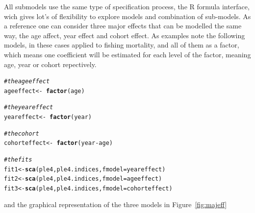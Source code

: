 \documentclass[a4paper,english,10pt]{article}\usepackage[]{graphicx}\usepackage[]{color}
\makeatletter
\newcommand{\hlcom}[1]{\textcolor[rgb]{0.678,0.584,0.686}{\textit{#1}}}%
\newcommand{\hlopt}[1]{\textcolor[rgb]{0,0,0}{#1}}%
\newcommand{\hlstd}[1]{\textcolor[rgb]{0.345,0.345,0.345}{#1}}%
\newcommand{\hlkwb}[1]{\textcolor[rgb]{0.69,0.353,0.396}{#1}}%
\newcommand{\hlkwc}[1]{\textcolor[rgb]{0.333,0.667,0.333}{#1}}%
\newcommand{\hlkwd}[1]{\textcolor[rgb]{0.737,0.353,0.396}{\textbf{#1}}}%
\newenvironment{kframe}{%
 \def\at@end@of@kframe{}%
 \ifinner\ifhmode%
  \def\at@end@of@kframe{\end{minipage}}%
  \begin{minipage}{\columnwidth}%
 \fi\fi%
 \def\FrameCommand##1{\hskip\@totalleftmargin \hskip-\fboxsep
 \colorbox{shadecolor}{##1}\hskip-\fboxsep
     \hskip-\linewidth \hskip-\@totalleftmargin \hskip\columnwidth}%
 \MakeFramed {\advance\hsize-\width
   \@totalleftmargin\z@ \linewidth\hsize
   \@setminipage}}%
 {\par\unskip\endMakeFramed%
 \at@end@of@kframe}
\newenvironment{knitrout}{}{} %
\makeatother
\begin{document}
All submodels use the same type of specification process, the R formula interface, wich gives lot's of flexibility to explore models and combination of sub-models. As a reference one can consider three major effects that can be modelled the same way, the age affect, year effect and cohort effect. As examples note the following models, in these cases applied to fishing mortality, and all of them as a factor, which means one coefficient will be estimated for each level of the factor, meaning age, year or cohort repectively.

\begin{knitrout}
\color{fgcolor}\begin{kframe}
\begin{alltt}
\hlcom{# the age effect}
\hlstd{ageeffect} \hlkwb{<-} \hlopt{~}\hlkwd{factor}\hlstd{(age)}

\hlcom{# the year effect}
\hlstd{yeareffect} \hlkwb{<-} \hlopt{~}\hlkwd{factor}\hlstd{(year)}

\hlcom{# the cohort}
\hlstd{cohorteffect} \hlkwb{<-} \hlopt{~}\hlkwd{factor}\hlstd{(year} \hlopt{-} \hlstd{age)}

\hlcom{# the fits}
\hlstd{fit1} \hlkwb{<-} \hlkwd{sca}\hlstd{(ple4, ple4.indices,} \hlkwc{fmodel} \hlstd{= yeareffect)}
\hlstd{fit2} \hlkwb{<-} \hlkwd{sca}\hlstd{(ple4, ple4.indices,} \hlkwc{fmodel} \hlstd{= ageeffect)}
\hlstd{fit3} \hlkwb{<-} \hlkwd{sca}\hlstd{(ple4, ple4.indices,} \hlkwc{fmodel} \hlstd{= cohorteffect)}
\end{alltt}
\end{kframe}
\end{knitrout}

and the graphical representation of the three models in Figure~\ref{fig:majeff}
\end{document}

